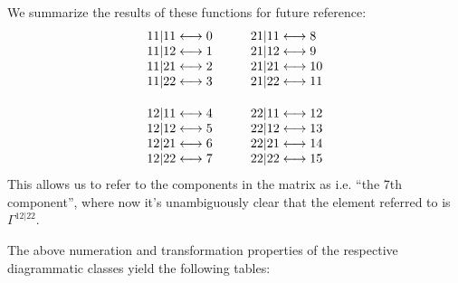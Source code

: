\documentclass[12pt,a4paper,roman]{article}
\begin{document}
We summarize the results of these functions for future reference:
\begin{align}
\begin{array}{r@{\mskip\thickmuskip}l}
11|11 &\longleftrightarrow 0 \\
11|12 &\longleftrightarrow 1 \\
11|21 &\longleftrightarrow 2 \\
11|22 &\longleftrightarrow 3 \\
\vspace{0.05cm}\\
12|11 &\longleftrightarrow 4 \\
12|12 &\longleftrightarrow 5 \\
12|21 &\longleftrightarrow 6 \\
12|22 &\longleftrightarrow 7
\end{array} 
\quad  \quad
\begin{array}{l@{\mskip\thickmuskip}l}
21|11 &\longleftrightarrow 8 \\
21|12 &\longleftrightarrow 9 \\
21|21 &\longleftrightarrow 10 \\
21|22 &\longleftrightarrow 11 \\
\vspace{0.05cm}\\
22|11 &\longleftrightarrow 12 \\
22|12 &\longleftrightarrow 13 \\
22|21 &\longleftrightarrow 14 \\
22|22 &\longleftrightarrow 15
\end{array}
\end{align}
This allows us to refer to the components in the matrix as i.e. ``the 7th component'', where now it's unambiguously clear that the element referred to is $\Gamma^{12|22}$.

The above numeration and transformation properties of the respective diagrammatic classes yield the following tables:
\end{document}
